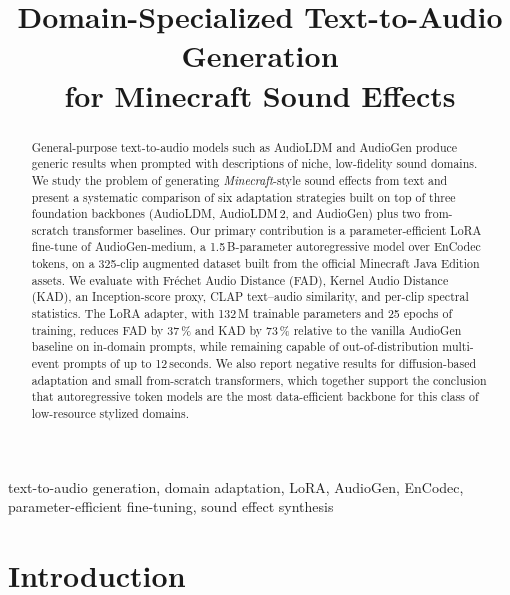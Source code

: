 \documentclass[conference]{IEEEtran}
\begin{document}
\title{Domain-Specialized Text-to-Audio Generation\\for Minecraft Sound Effects}

\author{
}

\maketitle

\begin{abstract}
General-purpose text-to-audio models such as AudioLDM and AudioGen produce
generic results when prompted with descriptions of niche, low-fidelity sound
domains. We study the problem of generating \emph{Minecraft}-style sound
effects from text and present a systematic comparison of six adaptation
strategies built on top of three foundation backbones (AudioLDM,
AudioLDM\,2, and AudioGen) plus two from-scratch transformer baselines.
Our primary contribution is a parameter-efficient LoRA fine-tune of
AudioGen-medium, a 1.5\,B-parameter autoregressive model over EnCodec
tokens, on a 325-clip augmented dataset built from the official Minecraft
Java Edition assets. We evaluate with Fr\'echet Audio Distance (FAD),
Kernel Audio Distance (KAD), an Inception-score proxy, CLAP text--audio
similarity, and per-clip spectral statistics. The LoRA adapter, with
132\,M trainable parameters and 25 epochs of training, reduces FAD by
37\,\% and KAD by 73\,\% relative to the vanilla AudioGen baseline on
in-domain prompts, while remaining capable of out-of-distribution
multi-event prompts of up to 12\,seconds. We also report negative results
for diffusion-based adaptation and small from-scratch transformers,
which together support the conclusion that autoregressive token models
are the most data-efficient backbone for this class of low-resource
stylized domains.
\end{abstract}

\begin{IEEEkeywords}
text-to-audio generation, domain adaptation, LoRA, AudioGen, EnCodec,
parameter-efficient fine-tuning, sound effect synthesis
\end{IEEEkeywords}

\section{Introduction}
\end{document}
